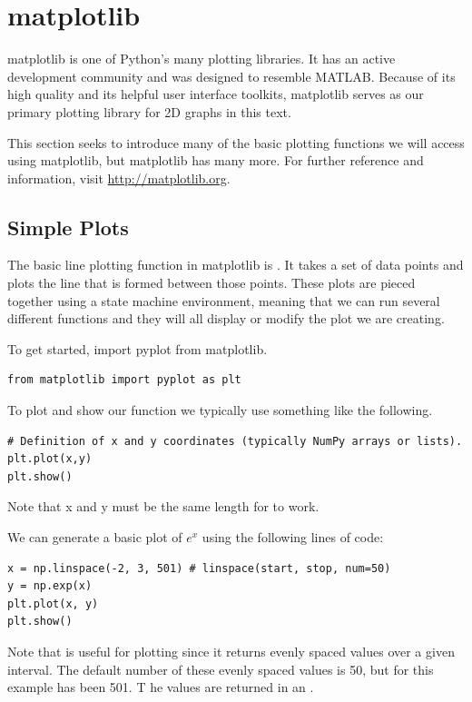 \label{lab:Matplotlib_and_Mayavi}

\section*{matplotlib}
matplotlib is one of Python's many plotting libraries.
It has an active development community and was designed to resemble MATLAB.
Because of its high quality and its helpful user interface toolkits, matplotlib serves as our primary plotting library for 2D graphs in this text.

This section seeks to introduce many of the basic plotting functions we will access using matplotlib, but matplotlib has many more.
For further reference and information, visit \url{http://matplotlib.org}.


\subsection*{Simple Plots}
The basic line plotting function in matplotlib is .
It takes a set of data points and plots the line that is formed between those points.
These plots are pieced together using a state machine environment, meaning that we can run several different functions and they will all display or modify the plot we are creating.

To get started, import pyplot from matplotlib.
\begin{lstlisting}
from matplotlib import pyplot as plt
\end{lstlisting}

To plot and show our function we typically use something like the following.
\begin{lstlisting}
# Definition of x and y coordinates (typically NumPy arrays or lists).
plt.plot(x,y)
plt.show()
\end{lstlisting}

Note that x and y must be the same length for  to work.

We can generate a basic plot of $e^x$ using the following lines of code:
\begin{lstlisting}
x = np.linspace(-2, 3, 501) # linspace(start, stop, num=50)
y = np.exp(x)
plt.plot(x, y)
plt.show()
\end{lstlisting}

Note that  is useful for plotting since it returns evenly spaced values over a given interval.
The default number of these evenly spaced values is 50, but for this example has been 501. T
he values are returned in an .

